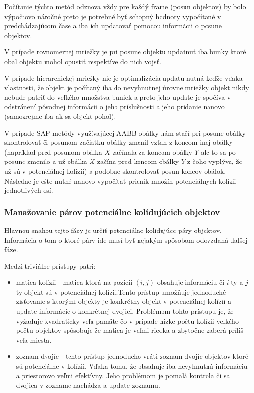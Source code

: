 \documentclass[a4paper]{article}
\begin{document}
	Počítanie týchto metód odznova vždy pre každý frame (posun objektov) by bolo výpočtovo náročné preto je potrebné byť schopný hodnoty vypočítané v predchádzajúcom čase a iba ich updatovať pomocou informácii o posune objektov.
	
	V prípade rovnomernej mriežky je pri posune objektu updatnuť iba bunky ktoré obal objektu mohol opustiť respektíve do nich vojsť.
	
	V prípade hierarchickej mriežky nie je optimalizácia updatu nutná keďže vďaka vlastnosti, že objekt je počítaný iba do nevyhnutnej úrovne mriežky objekt nikdy nebude patriť do veľkého množstva buniek a preto jeho update je spočíva v odstránení pôvodnej informácii o jeho príslušnosti a jeho pridanie nanovo (samozrejme iba ak sa objekt pohol). 
	
	V prípade SAP metódy využívajúcej AABB obálky nám stačí pri posune obálky skontrolovať či posunom začiatku obálky zmenil vzťah z koncom inej obálky (napríklad pred posunom obálka $X$ začínala za koncom obálky $Y$ ale to sa po posune zmenilo a už obálka $X$ začína pred koncom obálky $Y$ z čoho vyplýva, že už sú v potenciálnej kolízii) a podobne skontrolovať posun koncov obálok. Následne je ešte nutné nanovo vypočítať prienik množín potenciálnych kolízii jednotlivých osí.
	
	\subsubsection{Manažovanie párov potenciálne kolídujúcich objektov}
	
	Hlavnou snahou tejto fázy je určiť potenciálne kolidujúce páry objektov. Informácia o tom o ktoré páry ide musí byť nejakým spôsobom odovzdaná ďalšej fáze.
	
	Medzi triviálne prístupy patrí:
	\begin{itemize}
		\item matica kolízii - matica ktorá na pozícii $ \left( i,j \right)$ obsahuje informáciu či $i$-ty a $j$-ty objekt sú v potenciálnej kolízii.Tento prístup umožňuje jednoduché zisťovanie s ktorými objekty je konkrétny objekt v potenciálnej kolízii a update informácie o konkrétnej dvojici. Problémom tohto prístupu je, že vyžaduje kvadraticky veľa pamäte čo v prípade nízke počtu kolízii veľkého počtu objektov spôsobuje že matica je veľmi riedka a zbytočne zaberá príliš veľa miesta.
		\item zoznam dvojíc - tento prístup jednoducho vráti zoznam dvojíc objektov ktoré sú potenciálne v kolízii. Vďaka tomu, že obsahuje iba nevyhnutnú informáciu a priestorovo veľmi efektívny. Jeho problémom je pomalá kontrola či sa dvojica v zozname nachádza a update zoznamu.    
	\end{itemize}
\end{document}
